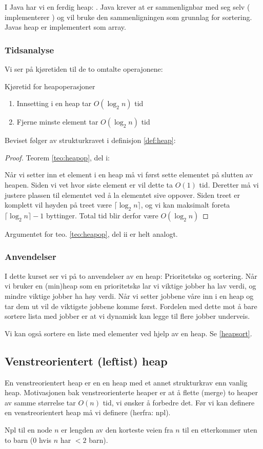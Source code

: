 I Java har vi en ferdig heap: . Java krever at  er sammenlignbar med seg selv ( implementerer ) og vil bruke den sammenligningen som grunnlag for sortering. Javas heap er implementert som array. 

\subsubsection{Tidsanalyse}
Vi ser på kjøretiden til de to omtalte operajonene:
\begin{theorem} Kjøretid for heapoperasjoner \label{teo:heapop}
\begin{enumerate}[i]
\item Innsetting i en heap tar $ O(\log_2 n) $ tid
\item Fjerne minste element tar $ O(\log_2 n) $ tid
\end{enumerate}
\end{theorem}
Beviset følger av strukturkravet i definisjon \ref{def:heap}:
\begin{proof} Teorem \ref{teo:heapop}, del i:

Når vi setter inn et element i en heap må vi først sette elementet på slutten av heapen. Siden vi vet hvor siste element er vil dette ta $ O(1) $ tid. Deretter må vi justere plassen til elementet ved å la elementet sive oppover. Siden treet er komplett vil høyden på treet være $ \lceil\log_2 n\rceil $, og vi kan maksimalt foreta $ \lceil\log_2 n\rceil - 1 $ byttinger. Total tid blir derfor være $ O(\log_2 n) $
\end{proof}
Argumentet for teo. \ref{teo:heapop}, del ii er helt analogt. 


\subsubsection{Anvendelser}
I dette kurset ser vi på to anvendelser av en heap: Prioritetskø og sortering. Når vi bruker en (min)heap som en prioritetskø lar vi viktige jobber ha lav verdi, og mindre viktige jobber ha høy verdi. Når vi setter jobbene våre inn i en heap og tar dem ut vil de viktigste jobbene komme først. Fordelen med dette mot å bare sortere lista med jobber er at vi dynamisk kan legge til flere jobber underveis. 

Vi kan også sortere en liste med elementer ved hjelp av en heap. Se \ref{heapsort}.



\subsection{Venstreorientert (leftist) heap}
En venstreorientert heap er en en heap med et annet strukturkrav enn vanlig heap. Motivasjonen bak venstreorienterte heaper er at å flette (merge) to heaper av samme størrelse tar $ O(n) $ tid, vi ønsker å forbedre det. Før vi kan definere en venstreorientert heap må vi definere  (herfra: npl).
\begin{definition}
	Npl til en node $ n $ er lengden av den korteste veien fra $ n $ til en etterkommer uten to barn ($ 0 $ hvis $ n $ har $ <2 $ barn). 
\end{definition}

